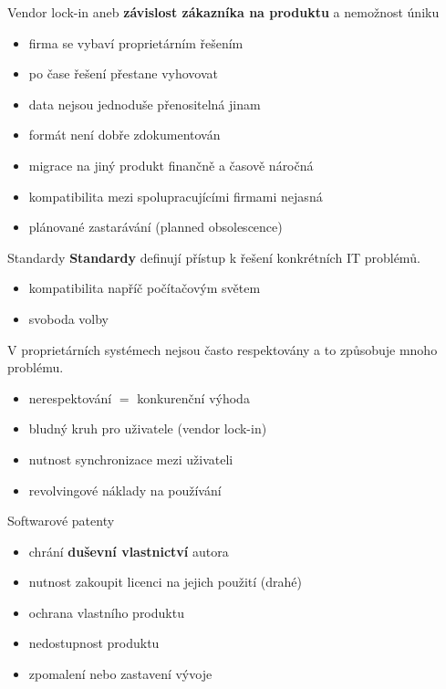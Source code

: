 \documentclass[11pt]{beamer}
\begin{document}
\begin{frame}{Vendor lock-in}
	aneb \textbf{závislost zákazníka na produktu} a nemožnost úniku
	
	\begin{itemize}
		\item firma se vybaví proprietárním řešením
		\item po čase řešení přestane vyhovovat
		\item data nejsou jednoduše přenositelná jinam
		\item formát není dobře zdokumentován
		\item migrace na jiný produkt finančně a časově náročná
		\item kompatibilita mezi spolupracujícími firmami nejasná
		\item plánované zastarávání (planned obsolescence)
	\end{itemize}
\end{frame}

\begin{frame}{Standardy}
	\textbf{Standardy} definují přístup k řešení konkrétních IT problémů.
 	 	
	\begin{itemize}
		\item kompatibilita napříč počítačovým světem
		\item svoboda volby
	\end{itemize}
	V proprietárních systémech nejsou často respektovány a to způsobuje mnoho problému.
	\begin{itemize}
		\item nerespektování $=$ konkurenční výhoda
		\item bludný kruh pro uživatele (vendor lock-in)
		\item nutnost synchronizace mezi uživateli
		\item revolvingové náklady na používání
	\end{itemize}
\end{frame}

\begin{frame}{Softwarové patenty}
	\begin{itemize}
		\item chrání \textbf{duševní vlastnictví} autora
		\item nutnost zakoupit licenci na jejich použití (drahé)
		\item ochrana vlastního produktu
		\item nedostupnost produktu
		\item zpomalení nebo zastavení vývoje
	\end{itemize}
\end{frame}
\end{document}
